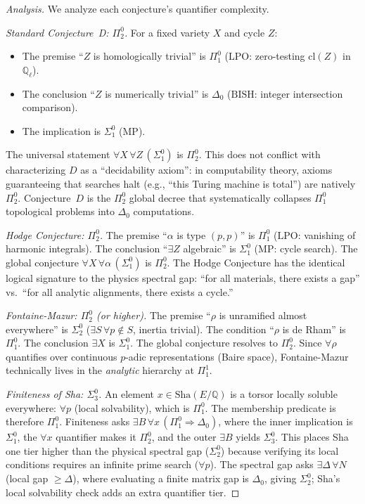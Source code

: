 \documentclass[11pt]{article}
\theoremstyle{definition}
\theoremstyle{remark}
\newcommand{\Q}{\mathbb{Q}}
\newcommand{\Qell}{\Q_\ell}
\newcommand{\LPO}{\mathrm{LPO}}
\newcommand{\MP}{\mathrm{MP}}
\newcommand{\BISH}{\mathrm{BISH}}
\begin{document}
\begin{proof}[Analysis]
We analyze each conjecture's quantifier complexity.

\emph{Standard Conjecture~D: $\Pi_2^0$.} For a fixed variety $X$ and cycle $Z$:
\begin{itemize}
\item The premise ``$Z$ is homologically trivial'' is $\Pi_1^0$ ($\LPO$: zero-testing $\mathrm{cl}(Z)$ in $\Qell$).
\item The conclusion ``$Z$ is numerically trivial'' is $\Delta_0$ ($\BISH$: integer intersection comparison).
\item The implication is $\Sigma_1^0$ ($\MP$).
\end{itemize}
The universal statement $\forall X\, \forall Z\, (\Sigma_1^0)$ is $\Pi_2^0$. This does not conflict with characterizing $D$ as a ``decidability axiom'': in computability theory, axioms guaranteeing that searches halt (e.g., ``this Turing machine is total'') are natively $\Pi_2^0$. Conjecture~$D$ is the $\Pi_2^0$ global decree that systematically collapses $\Pi_1^0$ topological problems into $\Delta_0$ computations.

\emph{Hodge Conjecture: $\Pi_2^0$.} The premise ``$\alpha$ is type $(p,p)$'' is $\Pi_1^0$ ($\LPO$: vanishing of harmonic integrals). The conclusion ``$\exists Z$ algebraic'' is $\Sigma_1^0$ ($\MP$: cycle search). The global conjecture $\forall X\, \forall \alpha\, (\Sigma_1^0)$ is $\Pi_2^0$. The Hodge Conjecture has the identical logical signature to the physics spectral gap: ``for all materials, there exists a gap'' vs.\ ``for all analytic alignments, there exists a cycle.''

\emph{Fontaine-Mazur: $\Pi_2^0$ (or higher).} The premise ``$\rho$ is unramified almost everywhere'' is $\Sigma_2^0$ ($\exists S\, \forall p \notin S$, inertia trivial). The condition ``$\rho$ is de Rham'' is $\Pi_1^0$. The conclusion $\exists X$ is $\Sigma_1^0$. The global conjecture resolves to $\Pi_2^0$. Since $\forall \rho$ quantifies over continuous $p$-adic representations (Baire space), Fontaine-Mazur technically lives in the \emph{analytic} hierarchy at $\Pi_1^1$.

\emph{Finiteness of Sha: $\Sigma_3^0$.} An element $x \in \text{Sha}(E/\Q)$ is a torsor locally soluble everywhere: $\forall p$ (local solvability), which is $\Pi_1^0$. The membership predicate is therefore $\Pi_1^0$. Finiteness asks $\exists B\, \forall x\, (\Pi_1^0 \Rightarrow \Delta_0)$, where the inner implication is $\Sigma_1^0$, the $\forall x$ quantifier makes it $\Pi_2^0$, and the outer $\exists B$ yields $\Sigma_3^0$. This places Sha one tier higher than the physical spectral gap ($\Sigma_2^0$) because verifying its local conditions requires an infinite prime search ($\forall p$). The spectral gap asks $\exists \Delta\, \forall N$ (local gap $\geq \Delta$), where evaluating a finite matrix gap is $\Delta_0$, giving $\Sigma_2^0$; Sha's local solvability check adds an extra quantifier tier.
\end{proof}
\end{document}
